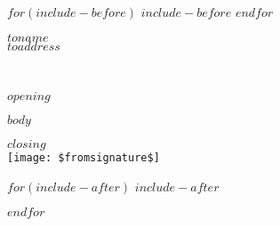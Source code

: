 \documentclass[$if(fontsize)$$fontsize$$else$11pt$endif$,a4paper,$for(classoption)$$classoption$$sep$,$endfor$]{letter}
\date{$date$}
\date{\Date~\Month~\Year}
\makeatletter
\renewcommand*{\opening}[1]{\thispagestyle{monash}%
   {\@date\par}%
  \vspace{2\parskip}%
  {\raggedright \toname \\ \toaddress \par}%
  \vspace{2\parskip}%
  #1\par\nobreak}}
\makeatother
\begin{document}
$for(include-before)$
$include-before$
$endfor$
\begin{letter}{$toname$\\$toaddress$}
\vspace*{1cm}\enlargethispage*{-2cm}
\opening{$opening$}
$body$
\closing{$closing$\\[0.2cm]\hspace*{0.5cm}\texttt{[image: \$fromsignature\$]}}
$for(include-after)$
$include-after$

$endfor$
\end{letter}
\end{document}
